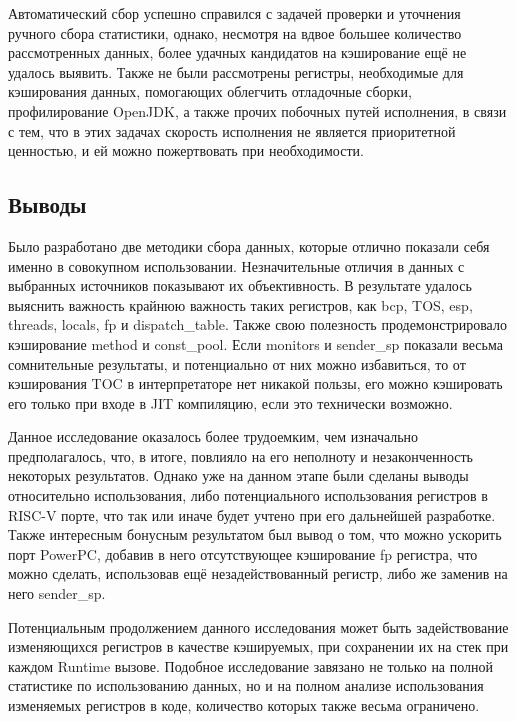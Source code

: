 Автоматический сбор успешно справился с задачей проверки и уточнения ручного сбора статистики, однако, несмотря на вдвое большее количество рассмотренных данных, более удачных кандидатов на кэширование ещё не удалось выявить. Также не были рассмотрены регистры, необходимые для кэширования данных, помогающих облегчить отладочные сборки, профилирование OpenJDK, а также прочих побочных путей исполнения, в связи с тем, что в этих задачах скорость исполнения не является приоритетной ценностью, и ей можно пожертвовать при необходимости. 


\subsection{Выводы}

Было разработано две методики сбора данных, которые отлично показали себя именно в совокупном использовании. Незначительные отличия в данных с выбранных источников показывают их объективность. В результате удалось выяснить важность крайнюю важность таких регистров, как bcp, TOS, esp, threads, locals, fp и dispatch\_table. Также свою полезность продемонстрировало кэширование method и const\_pool. Если monitors и sender\_sp показали весьма сомнительные результаты, и потенциально от них можно избавиться, то от кэширования TOC в интерпретаторе нет никакой пользы, его можно кэшировать его только при входе в JIT компиляцию, если это технически возможно.

Данное исследование оказалось более трудоемким, чем изначально предполагалось, что, в итоге, повлияло на его неполноту и незаконченность некоторых результатов. Однако уже на данном этапе были сделаны выводы относительно использования, либо потенциального использования регистров в RISC-V порте, что так или иначе будет учтено при его дальнейшей разработке. Также интересным бонусным результатом был вывод о том, что можно ускорить порт PowerPC, добавив в него отсутствующее кэширование fp регистра, что можно сделать, использовав ещё незадействованный регистр, либо же заменив на него sender\_sp.

Потенциальным продолжением данного исследования может быть задействование изменяющихся регистров в качестве кэшируемых, при сохранении их на стек при каждом Runtime вызове. Подобное исследование завязано не только на полной статистике по использованию данных, но и на полном анализе использования изменяемых регистров в коде, количество которых также весьма ограничено. 
